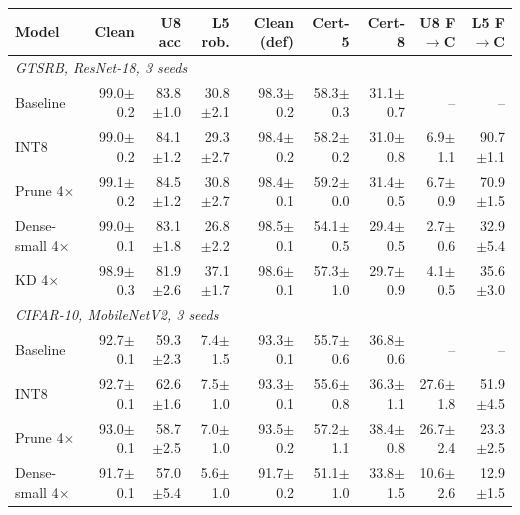 \begin{tabular}{lrrrrrrrr}
\toprule
Model & Clean & U8 acc & L5 rob. & Clean (def) & Cert-5 & Cert-8 & U8 F$\to$C & L5 F$\to$C \\
\midrule
\multicolumn{9}{l}{\textit{GTSRB, ResNet-18, 3 seeds}} \\
Baseline & 99.0{\scriptsize$\pm$0.2} & 83.8{\scriptsize$\pm$1.0} & 30.8{\scriptsize$\pm$2.1} & 98.3{\scriptsize$\pm$0.2} & 58.3{\scriptsize$\pm$0.3} & 31.1{\scriptsize$\pm$0.7} & -- & -- \\
INT8 & 99.0{\scriptsize$\pm$0.2} & 84.1{\scriptsize$\pm$1.2} & 29.3{\scriptsize$\pm$2.7} & 98.4{\scriptsize$\pm$0.2} & 58.2{\scriptsize$\pm$0.2} & 31.0{\scriptsize$\pm$0.8} & 6.9{\scriptsize$\pm$1.1} & 90.7{\scriptsize$\pm$1.1} \\
Prune 4$\times$ & 99.1{\scriptsize$\pm$0.2} & 84.5{\scriptsize$\pm$1.2} & 30.8{\scriptsize$\pm$2.7} & 98.4{\scriptsize$\pm$0.1} & 59.2{\scriptsize$\pm$0.0} & 31.4{\scriptsize$\pm$0.5} & 6.7{\scriptsize$\pm$0.9} & 70.9{\scriptsize$\pm$1.5} \\
Dense-small 4$\times$ & 99.0{\scriptsize$\pm$0.1} & 83.1{\scriptsize$\pm$1.8} & 26.8{\scriptsize$\pm$2.2} & 98.5{\scriptsize$\pm$0.1} & 54.1{\scriptsize$\pm$0.5} & 29.4{\scriptsize$\pm$0.5} & 2.7{\scriptsize$\pm$0.6} & 32.9{\scriptsize$\pm$5.4} \\
KD 4$\times$ & 98.9{\scriptsize$\pm$0.3} & 81.9{\scriptsize$\pm$2.6} & 37.1{\scriptsize$\pm$1.7} & 98.6{\scriptsize$\pm$0.1} & 57.3{\scriptsize$\pm$1.0} & 29.7{\scriptsize$\pm$0.9} & 4.1{\scriptsize$\pm$0.5} & 35.6{\scriptsize$\pm$3.0} \\
\midrule
\multicolumn{9}{l}{\textit{CIFAR-10, MobileNetV2, 3 seeds}} \\
Baseline & 92.7{\scriptsize$\pm$0.1} & 59.3{\scriptsize$\pm$2.3} & 7.4{\scriptsize$\pm$1.5} & 93.3{\scriptsize$\pm$0.1} & 55.7{\scriptsize$\pm$0.6} & 36.8{\scriptsize$\pm$0.6} & -- & -- \\
INT8 & 92.7{\scriptsize$\pm$0.1} & 62.6{\scriptsize$\pm$1.6} & 7.5{\scriptsize$\pm$1.0} & 93.3{\scriptsize$\pm$0.1} & 55.6{\scriptsize$\pm$0.8} & 36.3{\scriptsize$\pm$1.1} & 27.6{\scriptsize$\pm$1.8} & 51.9{\scriptsize$\pm$4.5} \\
Prune 4$\times$ & 93.0{\scriptsize$\pm$0.1} & 58.7{\scriptsize$\pm$2.5} & 7.0{\scriptsize$\pm$1.0} & 93.5{\scriptsize$\pm$0.2} & 57.2{\scriptsize$\pm$1.1} & 38.4{\scriptsize$\pm$0.8} & 26.7{\scriptsize$\pm$2.4} & 23.3{\scriptsize$\pm$2.5} \\
Dense-small 4$\times$ & 91.7{\scriptsize$\pm$0.1} & 57.0{\scriptsize$\pm$5.4} & 5.6{\scriptsize$\pm$1.0} & 91.7{\scriptsize$\pm$0.2} & 51.1{\scriptsize$\pm$1.0} & 33.8{\scriptsize$\pm$1.5} & 10.6{\scriptsize$\pm$2.6} & 12.9{\scriptsize$\pm$1.5} \\

\end{tabular}
